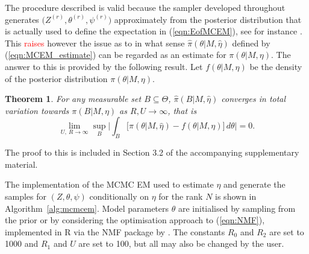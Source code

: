 \documentclass{bioinfo}
\newtheorem{thrm}{Theorem}
\begin{document}
The procedure described is valid because the sampler developed
throughout generates $\big(Z^{(r)}, \theta^{(r)}, \psi^{(r)}\big)$
approximately from the posterior distribution that is actually used to
define the expectation in (\ref{eqn:EofMCEM}), see for instance
\cite{FM}. This \textcolor{red}{raises} however the issue as to in
what sense $\widehat\pi(\theta|M, \hat\eta)$ defined by
(\ref{eqn:MCEM_estimate}) can be regarded as an estimate for
$\pi(\theta|M, \eta)$. The answer to this is provided by the following
result. Let $f(\theta|M, \eta)$ be the density of the posterior
distribution $\pi(\theta|M, \eta)$.

\begin{thrm} For any measurable set $B\subseteq \Theta$,
 $\widehat\pi(B|M,\hat\eta)$ converges in total variation
towards $\pi(B|M,\eta)$ as $R, U \to \infty$, that is
\[
   \lim_{U,\ R\to\infty}
   \sup_{B}
    \bigg|
     \int_B
     \Big[
       \widehat \pi(\theta|M, \hat\eta) - f(\theta|M,\eta)
     \Big]\, d\theta
    \bigg|
   = 0.
\]
\end{thrm}

The proof to this is included in Section 3.2 of the accompanying
supplementary material.

The implementation of the MCMC EM used to estimate $\eta$ and generate
the samples for $(Z, \theta, \psi)$ conditionally on $\eta$ for the
rank $N$ is shown in Algorithm~\ref{alg:mcmcem}. Model parameters
$\theta$ are initialised by sampling from the prior or by considering
the optimisation approach to (\ref{eqn:NMF}), implemented in R via the
NMF package by \cite{GS}. The constants $R_0$ and $R_2$ are set to
1000 and $R_1$ and $U$ are set to 100, but all may also be changed by
the user.
\end{document}
